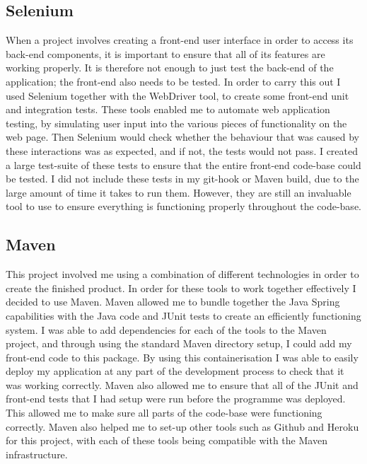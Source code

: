 \subsection{Selenium \label{selenium}}

When a project involves creating a front-end user interface in order to access its back-end components, it is important to ensure that all of its features are working properly. It is therefore not enough to just test the back-end of the application; the front-end also needs to be tested. In order to carry this out I used Selenium together with the WebDriver tool, to create some front-end unit and integration tests. These tools enabled me to automate web application testing, by simulating user input into the various pieces of functionality on the web page. Then Selenium would check whether the behaviour that was caused by these interactions was as expected, and if not, the tests would not pass. I created a large test-suite of these tests to ensure that the entire front-end code-base could be tested. I did not include these tests in my git-hook or Maven build, due to the large amount of time it takes to run them. However, they are still an invaluable tool to use to ensure everything is functioning properly throughout the code-base.

\subsection{Maven \label{maven}}

This project involved me using a combination of different technologies in order to create the finished product. In order for these tools to work together effectively I decided to use Maven. Maven allowed me to bundle together the Java Spring capabilities with the Java code and JUnit tests to create an efficiently functioning system. I was able to add dependencies for each of the tools to the Maven project, and through using the standard Maven directory setup, I could add my front-end code to this package. By using this containerisation I was able to easily deploy my application at any part of the development process to check that it was working correctly. Maven also allowed me to ensure that all of the JUnit and front-end tests that I had setup were run before the programme was deployed. This allowed me to make sure all parts of the code-base were functioning correctly. Maven also helped me to set-up other tools such as Github and Heroku for this project, with each of these tools being compatible with the Maven infrastructure.

